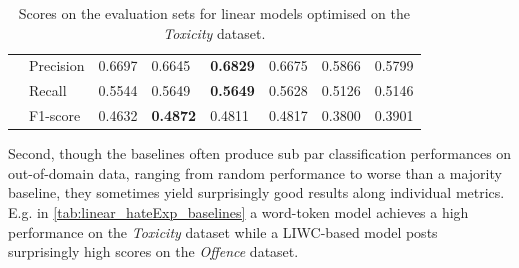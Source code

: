 \begin{table}[]
\begin{minipage}{0.42\paperheight}
{\begin{tabular}{ll|ll|ll|ll}
                                        & Precision & 0.6697 & 0.6645            & \bf{0.6829} & 0.6675      & 0.5866 & 0.5799          \\
                                        & Recall    & 0.5544 & 0.5649            & \bf{0.5649} & 0.5628      & 0.5126 & 0.5146          \\
                                        & F1-score  & 0.4632 & \bf{0.4872}       & 0.4811      & 0.4817      & 0.3800 & 0.3901
    \end{tabular}%
    }
    \caption{Scores on the evaluation sets for linear models optimised on the \textit{Toxicity} dataset.}
    \label{tab:linear_toxicity_baselines}
    \end{minipage}
\end{table}

Second, though the baselines often produce sub par classification performances on out-of-domain data, ranging from random performance to worse than a majority baseline, they sometimes yield surprisingly good results along individual metrics.
E.g. in \cref{tab:linear_hateExp_baselines} a word-token model achieves a high performance on the \textit{Toxicity} dataset while a LIWC-based model posts surprisingly high scores on the \textit{Offence} dataset.

